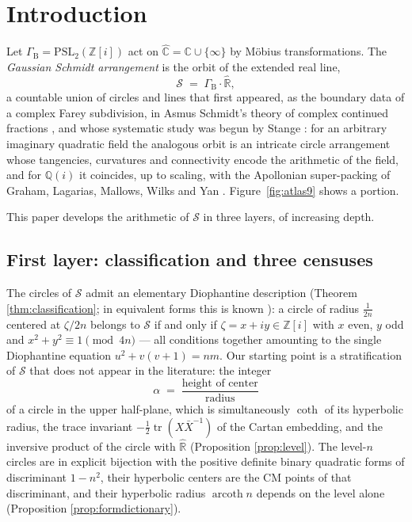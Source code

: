 \documentclass[11pt]{amsart}
\numberwithin{equation}{section}
\theoremstyle{plain}
\theoremstyle{definition}
\theoremstyle{remark}
\newcommand{\C}{\mathbb{C}}
\newcommand{\R}{\mathbb{R}}
\newcommand{\Q}{\mathbb{Q}}
\newcommand{\Z}{\mathbb{Z}}
\newcommand{\Zi}{\Z[i]}
\newcommand{\Rhat}{\widehat{\R}}
\newcommand{\Chat}{\widehat{\C}}
\newcommand{\PSL}{\mathrm{PSL}}
\newcommand{\tr}{\operatorname{tr}}
\newcommand{\arcoth}{\operatorname{arcoth}}
\newcommand{\Sarr}{\mathcal{S}}
\begin{document}
\maketitle
\tableofcontents

\section{Introduction}\label{sec:intro}

Let $\Gamma_{\mathrm{B}} = \PSL_2(\Zi)$ act on
$\Chat = \C \cup \{\infty\}$ by M\"obius transformations.  The
\emph{Gaussian Schmidt arrangement} is the orbit of the extended real
line,
\begin{equation}\label{eq:Sdef}
  \Sarr \;=\; \Gamma_{\mathrm{B}} \cdot \Rhat ,
\end{equation}
a countable union of circles and lines that first appeared, as the
boundary data of a complex Farey subdivision, in Asmus Schmidt's theory of
complex continued fractions \cite{Schmidt1975}, and whose systematic study
was begun by Stange \cite{StangeTAMS, StangeIMRN}: for an arbitrary
imaginary quadratic field the analogous orbit is an intricate circle
arrangement whose tangencies, curvatures and connectivity encode the
arithmetic of the field, and for $\Q(i)$ it coincides, up to scaling, with
the Apollonian super-packing of Graham, Lagarias, Mallows, Wilks and Yan
\cite{GLMWY2006, StangeTAMS}.  Figure~\ref{fig:atlas9} shows a portion.

This paper develops the arithmetic of $\Sarr$ in three layers, of
increasing depth.

\subsection*{First layer: classification and three censuses}
The circles of $\Sarr$ admit an elementary Diophantine description
(Theorem \ref{thm:classification}; in equivalent forms this is known
\cite{GLMWY2006, StangeTAMS, RickardsStange2026}): a circle of radius
$\tfrac1{2n}$ centered at $\zeta/2n$ belongs to $\Sarr$ if and only if
$\zeta = x + iy \in \Zi$ with $x$ even, $y$ odd and
$x^2 + y^2 \equiv 1 \pmod{4n}$ --- all conditions together amounting to the
single Diophantine equation $u^2 + v(v+1) = nm$.  Our starting point is a
stratification of $\Sarr$ that does not appear in the literature: the
integer
\[
  \alpha \;=\; \frac{\text{height of center}}{\text{radius}}
\]
of a circle in the upper half-plane, which is simultaneously
$\coth$ of its hyperbolic radius, the trace invariant
$-\tfrac12\tr(X\bar X^{-1})$ of the Cartan embedding, and the inversive
product of the circle with $\Rhat$ (Proposition \ref{prop:level}).  The
level-$n$ circles are in explicit bijection with the positive definite
binary quadratic forms of discriminant $1 - n^2$, their hyperbolic centers
are the CM points of that discriminant, and their hyperbolic radius
$\arcoth n$ depends on the level alone (Proposition
\ref{prop:formdictionary}).
\end{document}
